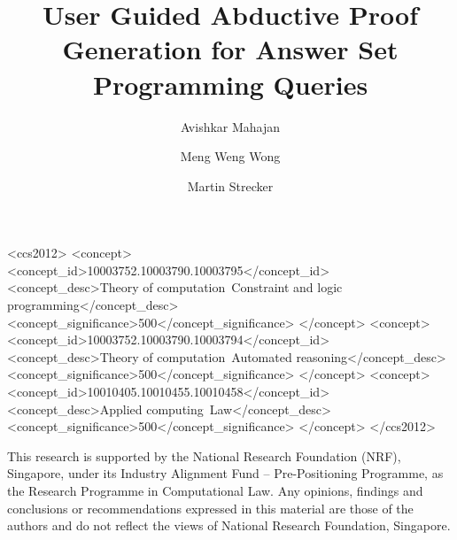 \documentclass[sigconf]{acmart}
\begin{document}
\title{User Guided Abductive Proof Generation for Answer Set Programming
  Queries}

\author{Avishkar Mahajan}
\author{Meng Weng Wong}

\author{Martin Strecker}



\begin{CCSXML}
<ccs2012>
   <concept>
       <concept_id>10003752.10003790.10003795</concept_id>
       <concept_desc>Theory of computation~Constraint and logic programming</concept_desc>
       <concept_significance>500</concept_significance>
       </concept>
   <concept>
       <concept_id>10003752.10003790.10003794</concept_id>
       <concept_desc>Theory of computation~Automated reasoning</concept_desc>
       <concept_significance>500</concept_significance>
       </concept>
   <concept>
       <concept_id>10010405.10010455.10010458</concept_id>
       <concept_desc>Applied computing~Law</concept_desc>
       <concept_significance>500</concept_significance>
       </concept>
 </ccs2012>
\end{CCSXML}


\maketitle
















%



\begin{acks}
This research is supported by the National Research Foundation (NRF),
Singapore, under its Industry Alignment Fund -- Pre-Positioning Programme, as
the Research Programme in Computational Law. Any opinions, findings and
conclusions or recommendations expressed in this material are those of the
authors and do not reflect the views of National Research Foundation,
Singapore.
\end{acks}
  
%



\newpage
\appendix

\end{document}
